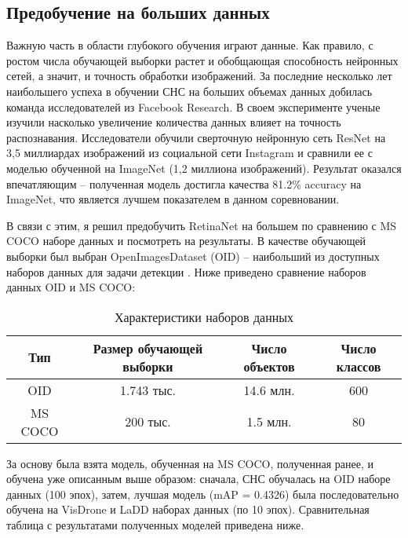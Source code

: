 \subsection{Предобучение на больших данных} \label{sect-6-2}

Важную часть в области глубокого обучения играют данные. Как правило, с ростом числа обучающей выборки растет и обобщающая способность нейронных сетей, а значит, и точность обработки изображений. За последние несколько лет наибольшего успеха в обучении СНС на больших объемах данных добилась команда исследователей из Facebook Research. В своем эксперименте \cite{lib-insta-net} ученые изучили насколько увеличение количества данных влияет на точность распознавания. Исследователи обучили сверточную нейронную сеть ResNet на 3,5 миллиардах изображений из социальной сети Instagram и сравнили ее с моделью обученной на ImageNet (1,2 миллиона изображений). Результат оказался впечатляющим -- полученная модель достигла качества 81.2\% accuracy на ImageNet, что является лучшем показателем в данном соревновании. 


В связи с этим, я решил предобучить RetinaNet на большем по сравнению с MS COCO наборе данных и посмотреть на результаты. В качестве обучающей выборки был выбран OpenImagesDataset (OID) -- наибольший из доступных наборов данных для задачи детекции \cite{lib-iod}. Ниже приведено сравнение наборов данных OID и MS COCO:

\begin{table}[H]
    \caption{Характеристики наборов данных}\label{datasets}
    \begin{tabular}{|c|c|c|c|}
        \hline
        {Тип} & {Размер обучающей выборки} & {Число объектов} & {Число классов} \\
        \hline
        OID & 1.743 тыс. & 14.6 млн. & 600 \\
        \hline
        MS COCO & 200 тыс. & 1.5 млн. & 80 \\
        \hline
    \end{tabular}
\end{table}

За основу была взята модель, обученная на MS COCO, полученная ранее, и обучена уже описанным выше образом: сначала, СНС обучалась на OID наборе данных (100 эпох), затем, лучшая модель (mAP = 0.4326) была последовательно обучена на VisDrone и LaDD наборах данных (по 10 эпох). Сравнительная таблица с результатами полученных моделей приведена ниже.

